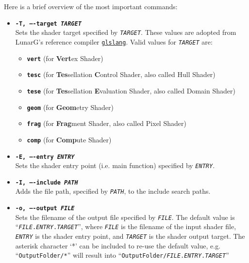 \documentclass{article}
\begin{document}
Here is a brief overview of the most important commands:
\begin{itemize}
	\item[] \textbf{\texttt{-T, ----target \textit{TARGET}}} \\
	Sets the shader target specified by \texttt{\textit{TARGET}}.
	These values are adopted from LunarG's reference compiler
	\href{https://www.khronos.org/opengles/sdk/tools/Reference-Compiler/}{\texttt{glslang}}.
	Valid values for \texttt{\textit{TARGET}} are:
	\begin{itemize}
		\item[] \textbf{\texttt{vert}} (for \textbf{Vert}ex Shader)
		\item[] \textbf{\texttt{tesc}} (for \textbf{Tes}sellation \textbf{C}ontrol Shader, also called Hull Shader)
		\item[] \textbf{\texttt{tese}} (for \textbf{Tes}sellation \textbf{E}valuation Shader, also called Domain Shader)
		\item[] \textbf{\texttt{geom}} (for \textbf{Geom}etry Shader)
		\item[] \textbf{\texttt{frag}} (for \textbf{Frag}ment Shader, also called Pixel Shader)
		\item[] \textbf{\texttt{comp}} (for \textbf{Comp}ute Shader)
	\end{itemize}
	
	\item[] \textbf{\texttt{-E, ----entry \textit{ENTRY}}} \\
	Sets the shader entry point (i.e. main function) specified by \texttt{\textit{ENTRY}}.
	
	\item[] \textbf{\texttt{-I, ----include \textit{PATH}}} \\
	Adds the file path, specified by \texttt{\textit{PATH}}, to the include search paths.
	
	\item[] \textbf{\texttt{-o, ----output \textit{FILE}}} \\
	Sets the filename of the output file specified by \texttt{\textit{FILE}}.
	The default value is ``\texttt{\textit{FILE}.\textit{ENTRY}.\textit{TARGET}}'',
	where \texttt{\textit{FILE}} is the filename of the input shader file, \texttt{\textit{ENTRY}} is the shader entry point,
	and \texttt{\textit{TARGET}} is the shader output target. The asterisk character `*' can be included to
	re-use the default value, e.g. ``\texttt{OutputFolder/*}'' will result into
	``\texttt{OutputFolder/\textit{FILE}.\textit{ENTRY}.\textit{TARGET}}''
	

\end{itemize}
\end{document}
